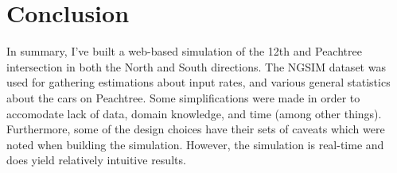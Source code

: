 \documentclass[a4paper,12pt]{article}
\begin{document}
\section{Conclusion}
In summary, I've built a web-based simulation of the 12th and Peachtree intersection in both the North and South
directions. The NGSIM dataset was used for gathering estimations about input rates, and various general statistics about
the cars on Peachtree. Some simplifications were made in order to accomodate lack of data, domain knowledge, and time
(among other things). Furthermore, some of the design choices have their sets of caveats which were noted when building
the simulation. However, the simulation is real-time and does yield relatively intuitive results.



\end{document}
